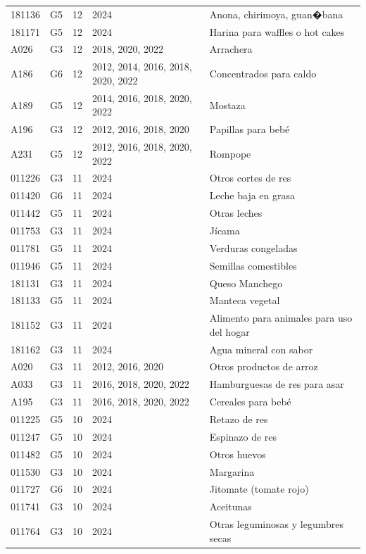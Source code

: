 \begin{table}[ht]
\begin{tabular}{llrll}
  181136 & G5 &  12 & 2024 & Anona, chirimoya, guan�bana \\ 
  181171 & G5 &  12 & 2024 & Harina para waffles o hot cakes \\ 
  A026 & G3 &  12 & 2018, 2020, 2022 & Arrachera \\ 
  A186 & G6 &  12 & 2012, 2014, 2016, 2018, 2020, 2022 & Concentrados para caldo \\ 
  A189 & G5 &  12 & 2014, 2016, 2018, 2020, 2022 & Mostaza \\ 
  A196 & G3 &  12 & 2012, 2016, 2018, 2020 & Papillas para bebé \\ 
  A231 & G5 &  12 & 2012, 2016, 2018, 2020, 2022 & Rompope \\ 
  011226 & G3 &  11 & 2024 & Otros cortes de res \\ 
  011420 & G6 &  11 & 2024 & Leche baja en grasa \\ 
  011442 & G5 &  11 & 2024 & Otras leches \\ 
  011753 & G3 &  11 & 2024 & Jícama \\ 
  011781 & G5 &  11 & 2024 & Verduras congeladas \\ 
  011946 & G5 &  11 & 2024 & Semillas comestibles \\ 
  181131 & G3 &  11 & 2024 & Queso Manchego \\ 
  181133 & G5 &  11 & 2024 & Manteca vegetal \\ 
  181152 & G3 &  11 & 2024 & Alimento para animales para uso del hogar \\ 
  181162 & G3 &  11 & 2024 & Agua mineral con sabor \\ 
  A020 & G3 &  11 & 2012, 2016, 2020 & Otros productos de arroz \\ 
  A033 & G3 &  11 & 2016, 2018, 2020, 2022 & Hamburguesas de res para asar \\ 
  A195 & G3 &  11 & 2016, 2018, 2020, 2022 & Cereales para bebé \\ 
  011225 & G5 &  10 & 2024 & Retazo de res \\ 
  011247 & G5 &  10 & 2024 & Espinazo de res \\ 
  011482 & G5 &  10 & 2024 & Otros huevos \\ 
  011530 & G3 &  10 & 2024 & Margarina \\ 
  011727 & G6 &  10 & 2024 & Jitomate (tomate rojo) \\ 
  011741 & G3 &  10 & 2024 & Aceitunas \\ 
  011764 & G3 &  10 & 2024 & Otras leguminosas y legumbres secas \\ 

\end{tabular}
\end{table}
